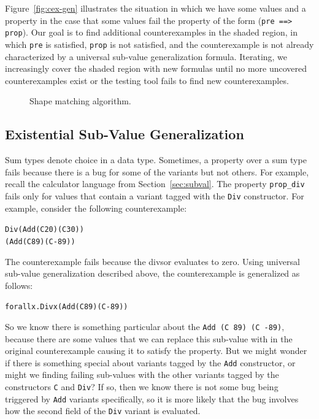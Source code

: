 \documentclass[10pt]{sigplanconf}
\newenvironment{code}{\begin{alltt}}{\end{alltt}}
\newcommand{\ttp}[1]{\texttt{#1}}
\begin{document}
Figure~\ref{fig:cex-gen} illustrates the situation in which we have some values
and a property in the case that some values fail the property of the form
(\ttp{pre ==> prop}).  Our goal is to find additional counterexamples in the
shaded region, in which \ttp{pre} is satisfied, \ttp{prop} is not satisfied, and
the counterexample is not already characterized by a universal sub-value
generalization formula.  Iterating, we increasingly cover the shaded region
with new formulas until no more uncovered counterexamples exist or the testing
tool fails to find new counterexamples.

\begin{figure}
  
  \caption{Shape matching algorithm.}
  \label{fig:matches}
\end{figure}




\subsection{Existential Sub-Value Generalization}

Sum types denote choice in a data type.  Sometimes, a property over a sum type
fails because there is a bug for some of the variants but not others.  For
example, recall the calculator language from Section~\ref{sec:subval}.  The
property \ttp{prop\_div} fails only for values that contain a variant tagged
with the \ttp{Div} constructor.  For example, consider the following counterexample:
%
\begin{code}
Div (Add (C 20) (C 30))
    (Add (C 89) (C -89))
\end{code}
%
\noindent
The counterexample fails because the divsor evaluates to zero.  Using universal
sub-value generalization described above, the counterexample is generalized as
follows:
%
\begin{code}
forall x . Div x (Add (C 89) (C -89))
\end{code}
%
\noindent
So we know there is something particular about the \ttp{Add (C 89) (C -89)},
because there are some values that we can replace this sub-value with in the
original counterexample causing it to satisfy the property.  But we might wonder
if there is something special about variants tagged by the \ttp{Add}
constructor, or might we finding failing sub-values with the other variants
tagged by the constructors \ttp{C} and \ttp{Div}?  If so, then we know there is
not some bug being triggered by \ttp{Add} variants specifically, so it is more
likely that the bug involves how the second field of the \ttp{Div} variant is
evaluated.
\end{document}
